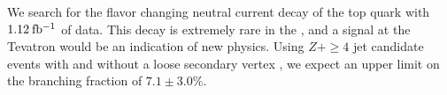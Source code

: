   We search for the flavor changing neutral current decay of the top
  quark \tZq with $1.12\:\mathrm{fb^{-1}}$ of data. This decay is extremely rare in 
  the \sm, and a signal at the Tevatron would be an indication 
  of new physics. Using $Z+\ge4$ jet candidate events with and without a loose
  secondary vertex \btag, we expect an upper limit on the branching 
  fraction of $7.1\pm3.0\%$.
